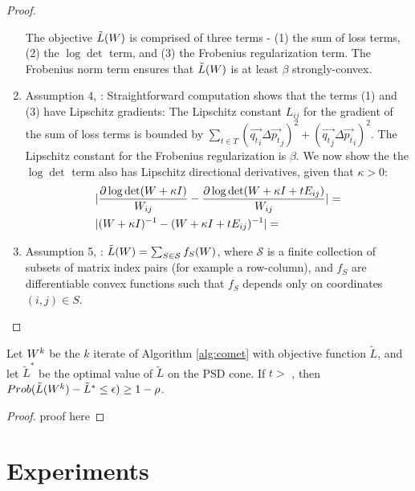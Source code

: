 \documentclass{article}
\begin{document}
\begin{proof}
  
  \begin{enumerate}
    The objective $\tilde{L}({W})$ is comprised of three terms - (1) the sum of
    loss terms, (2) the $\log \det$ term, and (3) the Frobenius
    regularization term. The Frobenius norm term ensures that $\tilde{L}({W})$ is
    at least $\beta$ strongly-convex.
    \item Assumption 4, \citet{richtarik2013optimal}: Straightforward
        computation shows that the terms (1) and (3) have Lipschitz
        gradients: The Lipschitz constant $L_{ij}$ for the gradient of
        the sum of loss terms is bounded by $\sum_{t \in T}
        (\vec{{q_t}_i} {\Delta \vec{p_t}}_j)^2 + (\vec{{q_t}_j}
        {\Delta \vec{p_t}}_i)^2$. The Lipschitz constant for the
        Frobenius regularization is $\beta$.  We now show the the
        $\log \det$ term also has Lipschitz directional derivatives,
        given that $\kappa >0$:
	\begin{align}
	  &| \frac{\partial \log \det ({W} + \kappa I)}{{W}_{ij}} -
	  \frac{\partial \log \det ({W} + \kappa I + t {E}_{ij})}{{W}_{ij}}| = \\
	  &| ({W} + \kappa I)^{-1} - ({W} + \kappa I + t{E}_{ij})^{-1} | = \\
	\end{align}
	
    \item Assumption 5, \citet{richtarik2013optimal}: $\tilde{L}({W}) = \sum_{S
	\in \mathcal{S}} f_S ({W})$, where $\mathcal{S}$ is a finite
	collection of subsets of matrix index pairs (for example a
	row-column), and $f_S$ are differentiable convex functions
	such that $f_S$ depends only on coordinates $(i,j) \in S$.
    \end{enumerate}
\end{proof}

\begin{corollary}
  Let ${W}^k$ be the $k$ iterate of Algorithm \ref{alg:comet} with
  objective function $\tilde{L}$, and let $\tilde{L}^*$ be the optimal
  value of $\tilde{L}$ on the PSD cone.  If $t >$ , then $Prob(\tilde{L}({W}^k) - \tilde{L}^* \leq
  \epsilon) \geq 1-\rho$.
\end{corollary}
\begin{proof}
  proof here
\end{proof}
\section{Experiments}
\end{document}
